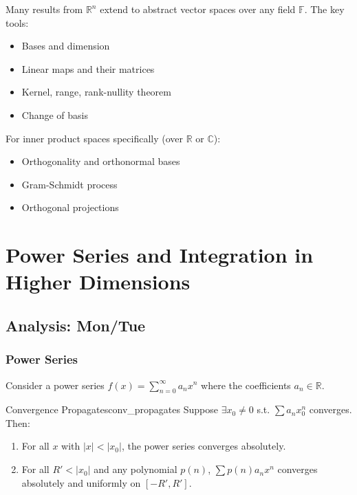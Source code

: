 \documentclass[11pt, letterpaper, openany]{book}
\begin{document}
\begin{remark}
Many results from $\mathbb{R}^n$ extend to abstract vector spaces over any field $\mathbb{F}$. The key tools:
\begin{itemize}
    \item Bases and dimension
    \item Linear maps and their matrices
    \item Kernel, range, rank-nullity theorem
    \item Change of basis
\end{itemize}
For inner product spaces specifically (over $\mathbb{R}$ or $\mathbb{C}$):
\begin{itemize}
    \item Orthogonality and orthonormal bases
    \item Gram-Schmidt process
    \item Orthogonal projections
\end{itemize}
\end{remark}


\chapter{Power Series and Integration in Higher Dimensions}

\section{Analysis: Mon/Tue}

\subsection{Power Series}

Consider a power series $f(x) = \sum_{n=0}^\infty a_n x^n$ where the coefficients $a_n \in \mathbb{R}$.

\begin{lem}{Convergence Propagates}{conv_propagates}
Suppose $\exists x_0 \neq 0$ s.t. $\sum a_n x_0^n$ converges. Then:
\begin{enumerate}
    \item For all $x$ with $|x| < |x_0|$, the power series converges absolutely.
    \item For all $R' < |x_0|$ and any polynomial $p(n)$, $\sum p(n) a_n x^n$ converges absolutely and uniformly on $[-R', R']$.
\end{enumerate}
\end{lem}
\end{document}
